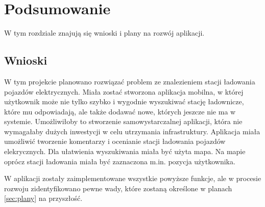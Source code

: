\chapter{Podsumowanie}
W tym rozdziale znajują się wnioski i plany na rozwój aplikacji.

\section{Wnioski}


W tym projekcie planowano rozwiązać problem ze znalezieniem stacji ładowania pojazdów elektrycznych. Miała zostać stworzona aplikacja mobilna, w której użytkownik może nie tylko szybko i wygodnie wyszukiwać stację ładownicze, które mu odpowiadają, ale także dodawać nowe, których jeszcze nie ma w systemie.
Umożliwiłoby to stworzenie samowystarczalnej aplikacji, która nie wymagałaby dużych inwestycji w celu utrzymania infrastruktury. Aplikacja miała umożliwić tworzenie komentarzy i ocenianie stacji ładowania pojazdów elekrycznych. Dla ułatwienia wyszukiwania miała być użyta mapa.
Na mapie oprócz stacji ładowania miała być zaznaczona m.in. pozycja użytkownika.

W aplikacji zostały zaimplementowane wszystkie powyższe funkcje, ale w procesie rozwoju zidentyfikowano pewne wady, które zostaną określone w planach \ref{sec:plany} na przyszłość.

